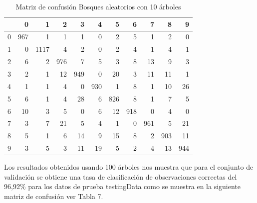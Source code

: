 \documentclass{article}
\begin{document}
\begin{table}[H]
\caption{\small{Matriz de confusión Bosques aleatorios con 10 árboles}}
\centering
\begin{tabular}{r|rrrrrrrrrr}
  \hline
 & 0 & 1 & 2 & 3 & 4 & 5 & 6 & 7 & 8 & 9 \\ 
  \hline
0 & 967 &   1 &   1 &   1 &   0 &   2 &   5 &   1 &   2 &   0 \\ 
  1 &   0 & 1117 &   4 &   2 &   0 &   2 &   4 &   1 &   4 &   1 \\ 
  2 &   6 &   2 & 976 &   7 &   5 &   3 &   8 &  13 &   9 &   3 \\ 
  3 &   2 &   1 &  12 & 949 &   0 &  20 &   3 &  11 &  11 &   1 \\ 
  4 &   1 &   1 &   4 &   0 & 930 &   1 &   8 &   1 &  10 &  26 \\ 
  5 &   6 &   1 &   4 &  28 &   6 & 826 &   8 &   1 &   7 &   5 \\ 
  6 &  10 &   3 &   5 &   0 &   6 &  12 & 918 &   0 &   4 &   0 \\ 
  7 &   3 &   7 &  21 &   5 &   4 &   1 &   0 & 961 &   5 &  21 \\ 
  8 &   5 &   1 &   6 &  14 &   9 &  15 &   8 &   2 & 903 &  11 \\ 
  9 &   3 &   5 &   3 &  11 &  19 &   5 &   2 &   4 &  13 & 944 \\ 
   \hline
\end{tabular}
\end{table}


Los resultados obtenidos usando 100 árboles nos muestra que para el conjunto de validación se obtiene una tasa de clasificación de observaciones correctas del 96,92\% para los datos de prueba testingData como se muestra en la siguiente matriz de confusión ver Tabla 7.
\end{document}
